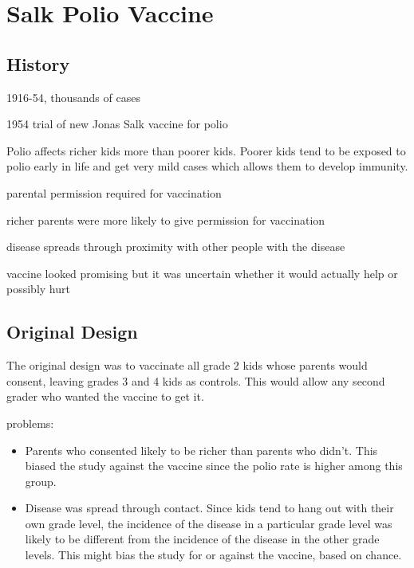 \documentclass[landscape]{exam}
\begin{document}
  \section{Salk Polio Vaccine}
  \subsection{History}
  \begin{itemize*}
    \item 1916-54, thousands of cases
    \item 1954 trial of new Jonas Salk vaccine for polio
    \item Polio affects richer kids more than poorer kids. Poorer kids tend to
      be exposed to polio early in life and get very mild cases which allows
      them to develop immunity.
    \item parental permission required for vaccination
    \item richer parents were more likely to give permission for vaccination
    \item disease spreads through proximity with other people with the disease
    \item vaccine looked promising but it was uncertain whether it would
      actually help or possibly hurt
  \end{itemize*}

  \subsection{Original Design}
  The original design was to vaccinate all grade 2 kids whose parents would
  consent, leaving grades 3 and 4 kids as controls.  This would allow any second
  grader who wanted the vaccine to get it.

  problems:
  \begin{itemize}

    \item Parents who consented likely to be richer than parents who didn't.
      This biased the study against the vaccine since the polio rate is higher
      among this group.

    \item Disease was spread through contact.  Since kids tend to hang out with
      their own grade level, the incidence of the disease in a particular grade
      level was likely to be different from the incidence of the disease in the
      other grade levels. This might bias the study for or against the vaccine,
      based on chance.
  \end{itemize}
\end{document}

